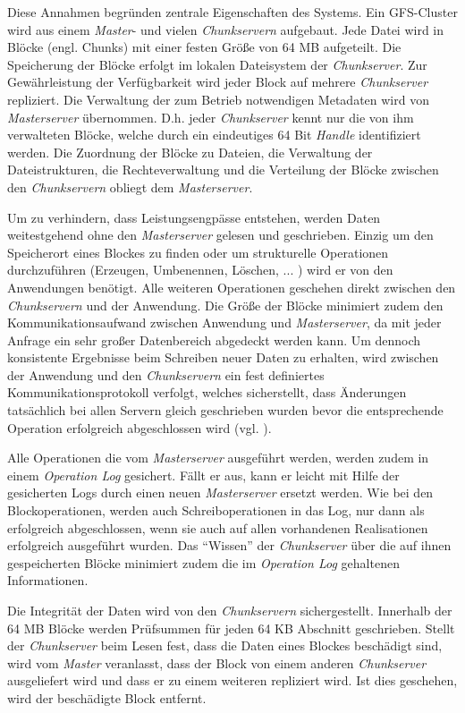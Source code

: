Diese Annahmen begründen zentrale Eigenschaften des Systems. Ein \acs{GFS}-Cluster wird aus einem \textit{Master}- und vielen \textit{Chunkservern} aufgebaut. Jede Datei wird in Blöcke (engl. Chunks) mit einer festen Größe von 64 MB aufgeteilt. Die Speicherung der Blöcke erfolgt im lokalen Dateisystem der \textit{Chunkserver}. Zur Gewährleistung der Verfügbarkeit wird jeder Block auf mehrere \textit{Chunkserver} repliziert. Die Verwaltung der zum Betrieb notwendigen Metadaten wird von \textit{Masterserver} übernommen. D.h. jeder \textit{Chunkserver} kennt nur die von ihm verwalteten Blöcke, welche durch ein eindeutiges 64 Bit \textit{Handle} identifiziert werden. Die Zuordnung der Blöcke zu Dateien, die Verwaltung der Dateistrukturen, die Rechteverwaltung und die Verteilung der Blöcke zwischen den \textit{Chunkservern} obliegt dem \textit{Masterserver}.

Um zu verhindern, dass Leistungsengpässe entstehen, werden Daten weitestgehend ohne den \textit{Masterserver} gelesen und geschrieben. Einzig um den Speicherort eines Blockes zu finden oder um strukturelle Operationen durchzuführen (Erzeugen, Umbenennen, Löschen, ... ) wird er von den Anwendungen benötigt. Alle weiteren Operationen geschehen direkt zwischen den \textit{Chunkservern} und der Anwendung. Die Größe der Blöcke minimiert zudem den Kommunikationsaufwand zwischen Anwendung und \textit{Masterserver}, da mit jeder Anfrage ein sehr großer Datenbereich abgedeckt werden kann. Um dennoch konsistente Ergebnisse beim Schreiben neuer Daten zu erhalten, wird zwischen der Anwendung und den \textit{Chunkservern} ein fest definiertes Kommunikationsprotokoll verfolgt, welches sicherstellt, dass Änderungen tatsächlich bei allen Servern gleich geschrieben wurden bevor die entsprechende Operation erfolgreich abgeschlossen wird (vgl. \citep[Kap. 3]{ghemawat03}).

Alle Operationen die vom \textit{Masterserver} ausgeführt werden, werden zudem in einem \textit{Operation Log} gesichert. Fällt er aus, kann er leicht mit Hilfe der gesicherten Logs  durch einen neuen \textit{Masterserver} ersetzt werden. Wie bei den Blockoperationen, werden auch Schreiboperationen in das Log, nur dann als erfolgreich abgeschlossen, wenn sie auch auf allen vorhandenen Realisationen erfolgreich ausgeführt wurden. Das ``Wissen'' der \textit{Chunkserver} über die auf ihnen gespeicherten Blöcke minimiert zudem die im \textit{Operation Log} gehaltenen Informationen.

Die Integrität der Daten wird von den \textit{Chunkservern} sichergestellt. Innerhalb der 64 MB Blöcke werden Prüfsummen für jeden 64 KB Abschnitt geschrieben. Stellt der \textit{Chunkserver} beim Lesen fest, dass die Daten eines Blockes beschädigt sind, wird vom \textit{Master} veranlasst, dass der Block von einem anderen \textit{Chunkserver} ausgeliefert wird und dass er zu einem weiteren repliziert wird. Ist dies geschehen, wird der beschädigte Block entfernt.

